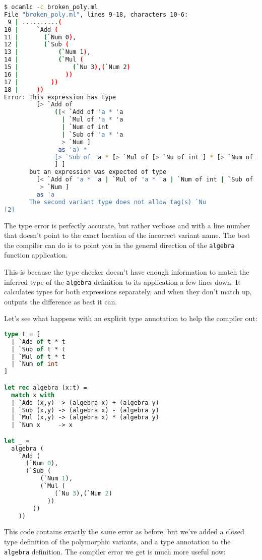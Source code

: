 \begin{lstlisting}[language=bash]
$ ocamlc -c broken_poly.ml
File "broken_poly.ml", lines 9-18, characters 10-6:
 9 | ..........(
10 |     `Add (
11 |       (`Num 0),
12 |       (`Sub (
13 |           (`Num 1),
14 |           (`Mul (
15 |               (`Nu 3),(`Num 2)
16 |             ))
17 |         ))
18 |     ))
Error: This expression has type
         [> `Add of
              ([< `Add of 'a * 'a
                | `Mul of 'a * 'a
                | `Num of int
                | `Sub of 'a * 'a
                > `Num ]
               as 'a) *
              [> `Sub of 'a * [> `Mul of [> `Nu of int ] * [> `Num of int ] ]
              ] ]
       but an expression was expected of type
         [< `Add of 'a * 'a | `Mul of 'a * 'a | `Num of int | `Sub of 'a * 'a
          > `Num ]
         as 'a
       The second variant type does not allow tag(s) `Nu
[2]
\end{lstlisting}

The type error is perfectly accurate, but rather verbose and with a line
number that doesn't point to the exact location of the incorrect variant
name. The best the compiler can do is to point you in the general
direction of the \passthrough{\lstinline!algebra!} function application.

This is because the type checker doesn't have enough information to
match the inferred type of the \passthrough{\lstinline!algebra!}
definition to its application a few lines down. It calculates types for
both expressions separately, and when they don't match up, outputs the
difference as best it can.

Let's see what happens with an explicit type annotation to help the
compiler out:

\begin{lstlisting}[language=Caml]
type t = [
  | `Add of t * t
  | `Sub of t * t
  | `Mul of t * t
  | `Num of int
]

let rec algebra (x:t) =
  match x with
  | `Add (x,y) -> (algebra x) + (algebra y)
  | `Sub (x,y) -> (algebra x) - (algebra y)
  | `Mul (x,y) -> (algebra x) * (algebra y)
  | `Num x     -> x

let _ =
  algebra (
    `Add (
      (`Num 0),
      (`Sub (
          (`Num 1),
          (`Mul (
              (`Nu 3),(`Num 2)
            ))
        ))
    ))
\end{lstlisting}

This code contains exactly the same error as before, but we've added a
closed type definition of the polymorphic variants, and a type
annotation to the \passthrough{\lstinline!algebra!} definition. The
compiler error we get is much more useful now:

